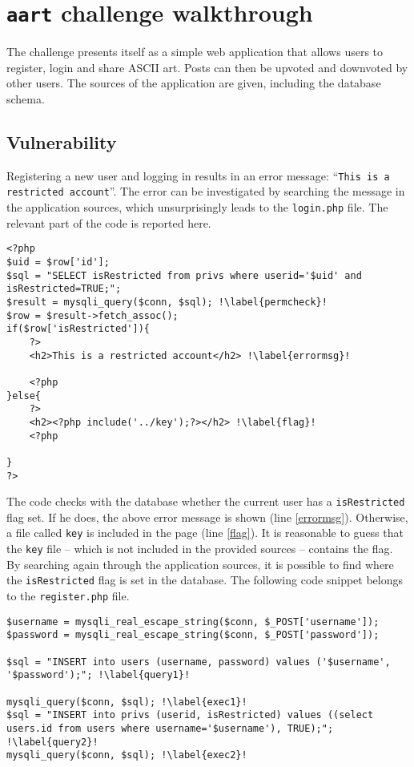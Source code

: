 \section{\texttt{aart} challenge walkthrough}

The challenge presents itself as a simple web application that allows users to register, login and share ASCII art. Posts can then be upvoted and downvoted by other users. The sources of the application are given, including the database schema. \\

\subsection{Vulnerability}
 
Registering a new user and logging in results in an error message: ``\texttt{This is a restricted account}''. The error can be investigated by searching the message in the application sources, which unsurprisingly leads to the \texttt{login.php} file. The relevant part of the code is reported here.

\begin{verbatim}
<?php
$uid = $row['id'];
$sql = "SELECT isRestricted from privs where userid='$uid' and isRestricted=TRUE;";
$result = mysqli_query($conn, $sql); !\label{permcheck}!
$row = $result->fetch_assoc();
if($row['isRestricted']){
    ?>
    <h2>This is a restricted account</h2> !\label{errormsg}!

    <?php
}else{
    ?>
    <h2><?php include('../key');?></h2> !\label{flag}!
    <?php

}
?>
\end{verbatim}

The code checks with the database whether the current user has a \texttt{isRestricted} flag set. If he does, the above error message is shown (line \ref{errormsg}). Otherwise, a file called \texttt{key} is included in the page (line \ref{flag}). It is reasonable to guess that the \texttt{key} file -- which is not included in the provided sources -- contains the flag. \\

By searching again through the application sources, it is possible to find where the \texttt{isRestricted} flag is set in the database. The following code snippet belongs to the \texttt{register.php} file.

\begin{verbatim}
$username = mysqli_real_escape_string($conn, $_POST['username']);
$password = mysqli_real_escape_string($conn, $_POST['password']);

$sql = "INSERT into users (username, password) values ('$username', '$password');"; !\label{query1}!

mysqli_query($conn, $sql); !\label{exec1}!
$sql = "INSERT into privs (userid, isRestricted) values ((select users.id from users where username='$username'), TRUE);"; !\label{query2}!
mysqli_query($conn, $sql); !\label{exec2}!
\end{verbatim}

